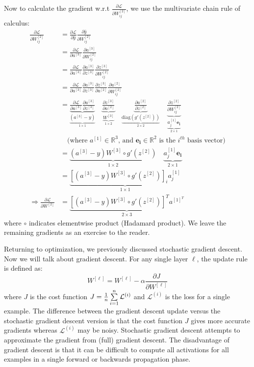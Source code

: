 \documentclass{article}
\numberwithin{equation}{section}
\begin{document}
Now to calculate the gradient w.r.t $\frac{\partial \mathcal{L}}{\partial W^{[2]}_{ij}}$, we use the multivariate chain rule of calculus:
\begin{align*}
\frac{\partial \mathcal{L}}{\partial W^{[2]}_{ij}} &= \frac{\partial \mathcal{L}}{\partial \hat{y}} \frac{\partial \hat{y}}{\partial W^{[2]}_{ij}} \\
&= \frac{\partial \mathcal{L}}{\partial a^{[3]}} \frac{\partial a^{[3]}}{\partial W^{[2]}_{ij}} \\
&= \frac{\partial \mathcal{L}}{\partial a^{[3]}} \frac{\partial a^{[3]}}{\partial z^{[3]}} \frac{\partial z^{[3]}}{\partial W^{[2]}_{ij}} \\
&= \frac{\partial \mathcal{L}}{\partial a^{[3]}} \frac{\partial a^{[3]}}{\partial z^{[3]}} \frac{\partial z^{[3]}}{\partial a^{[2]}} \frac{\partial a^{[2]}}{\partial W^{[2]}_{ij}} \\
&= \underbrace{\frac{\partial \mathcal{L}}{\partial a^{[3]}}  \frac{\partial a^{[3]}}{\partial z^{[3]}} }_{ \underbrace{(a^{[3]}-y)}_{1\times 1} } \quad \underbrace{ \frac{\partial z^{[3]}}{\partial a^{[2]}} }_{ \underbrace{ W^{[3]} }_{1\times 2} } \quad \underbrace{ \frac{\partial a^{[2]}}{\partial z^{[2]}} }_{ \underbrace{\text{diag} \left(g'(z^{[2]})\right)  }_{2\times 2} } \quad \underbrace{\frac{\partial z^{[2]}} {\partial W^{[2]}_{ij}}}_{\underbrace{a^{[1]}_j\mathbf{e_i} }_{2\times 1} } \\
&\quad\text{(where $a^{[1]} \in \mathbb{R}^3$, and $\mathbf{e_i} \in \mathbb{R}^2$ is the $i^{th}$ basis vector)} \\
&= \underbrace{ (a^{[3]}-y) W^{[3]} \circ g'(z^{[2]}) }_{1\times 2} \quad \underbrace{a^{[1]}_j\mathbf{e_i} }_{2\times 1}  \\
&= \underbrace{ \left[(a^{[3]}-y) W^{[3]} \circ g'(z^{[2]})\right]_i a^{[1]}_j }_{1\times 1} \\
\Rightarrow \frac{\partial \mathcal{L}}{\partial W^{[2]}} &= \underbrace{ \left[(a^{[3]}-y) W^{[3]} \circ g'(z^{[2]})\right]^T {a^{[1]^T}}}_{2\times 3}
\end{align*}
where $\circ$ indicates elementwise product (Hadamard product). We leave the remaining gradients as an exercise to the reader.

Returning to optimization, we previously discussed stochastic gradient descent. Now we will talk about gradient descent.
For any single layer $\ell$, the update rule is defined as:
\begin{equation}
W^{[\ell]} = W^{[\ell]} - \alpha \frac{\partial J}{\partial W^{[\ell]}}
\end{equation}
where $J$ is the cost function $J = \frac{1}{{n}} \sum\limits_{i=1}^{{n}} \mathcal{L}^{(i)}$ and $\mathcal{L}^{(i)}$ is the loss for a single example.
The difference between the gradient descent update versus the stochastic gradient descent version is that the cost function $J$ gives more accurate gradients whereas $\mathcal{L}^{(i)}$ may be noisy.
Stochastic gradient descent attempts to approximate the gradient from (full) gradient descent.
The disadvantage of gradient descent is that it can be difficult to compute all activations for all examples in a single forward or backwards propagation phase.
\end{document}
